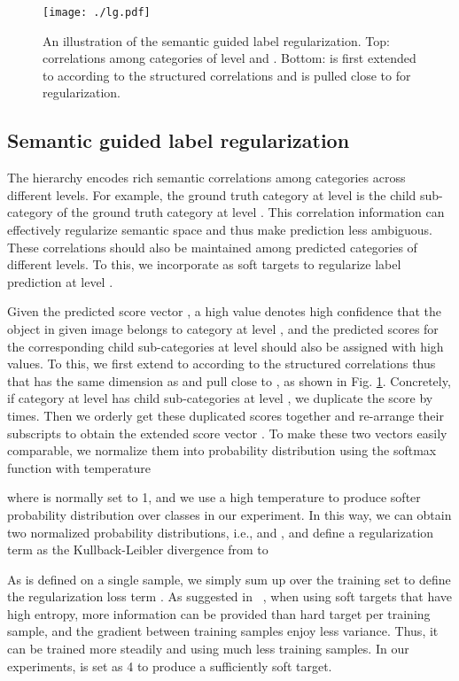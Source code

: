 \documentclass[sigconf]{acmart}
\begin{document}
\begin{figure}[!t]
   \centering{}
   \texttt{[image: ./lg.pdf]} \caption{An illustration of the semantic guided label regularization. Top: correlations among categories of level  and . Bottom:  is first extended to  according to the structured correlations and  is pulled close to  for regularization.}
   \label{fig:label-regularization}
\end{figure} 


\subsection{Semantic guided label regularization}
The hierarchy encodes rich semantic correlations among categories across different levels. For example, the ground truth category at level  is the child sub-category of the ground truth category at level . This correlation information can effectively regularize semantic space and thus make prediction less ambiguous. These correlations should also be maintained among predicted categories of different levels. To this, we incorporate  as soft targets to regularize label prediction at level .

Given the predicted score vector , a high value  denotes high confidence that the object in given image belongs to category  at level , and the predicted scores for the corresponding child sub-categories at level  should also be assigned with high values. To this, we first extend  to  according to the structured correlations thus that  has the same dimension as  and pull  close to , as shown in Fig. \ref{fig:label-regularization}. Concretely, if category  at level  has  child sub-categories at level , we duplicate the score  by  times. Then we orderly get these duplicated scores together and re-arrange their subscripts to obtain the extended score vector . To make these two vectors easily comparable, we normalize them into probability distribution using the softmax function with temperature 

where  is normally set to 1, and we use a high temperature to produce softer probability distribution over classes in our experiment. In this way, we can obtain two normalized probability distributions, i.e.,  and , and define a regularization term as the Kullback-Leibler divergence from  to 

As  is defined on a single sample, we simply sum up  over the training set to define the regularization loss term . As suggested in ~\cite{hinton2015distilling}, when using soft targets that have high entropy, more information can be provided than hard target per training sample, and the gradient between training samples enjoy less variance. Thus, it can be trained more steadily and using much less training samples. In our experiments,  is set as 4 to produce a sufficiently soft target.
\end{document}
